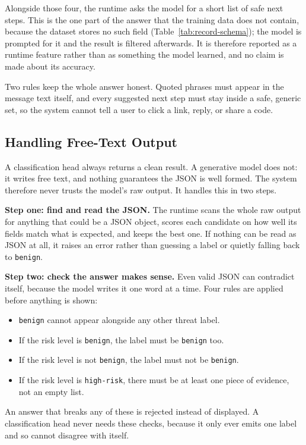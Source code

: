 Alongside those four, the runtime asks the model for a short list of safe next steps. This is the one part of the answer that the training data does not contain, because the dataset stores no such field (Table~\ref{tab:record-schema}); the model is prompted for it and the result is filtered afterwards. It is therefore reported as a runtime feature rather than as something the model learned, and no claim is made about its accuracy.

Two rules keep the whole answer honest. Quoted phrases must appear in the message text itself, and every suggested next step must stay inside a safe, generic set, so the system cannot tell a user to click a link, reply, or share a code.

\subsection*{Handling Free-Text Output}

A classification head always returns a clean result. A generative model does not: it writes free text, and nothing guarantees the JSON is well formed. The system therefore never trusts the model's raw output. It handles this in two steps.

\textbf{Step one: find and read the JSON.} The runtime scans the whole raw output for anything that could be a JSON object, scores each candidate on how well its fields match what is expected, and keeps the best one. If nothing can be read as JSON at all, it raises an error rather than guessing a label or quietly falling back to \texttt{benign}.

\textbf{Step two: check the answer makes sense.} Even valid JSON can contradict itself, because the model writes it one word at a time. Four rules are applied before anything is shown:

\begin{itemize}\itemsep2pt
\item \texttt{benign} cannot appear alongside any other threat label.
\item If the risk level is \texttt{benign}, the label must be \texttt{benign} too.
\item If the risk level is not \texttt{benign}, the label must not be \texttt{benign}.
\item If the risk level is \texttt{high-risk}, there must be at least one piece of evidence, not an empty list.
\end{itemize}

\noindent An answer that breaks any of these is rejected instead of displayed. A classification head never needs these checks, because it only ever emits one label and so cannot disagree with itself.

